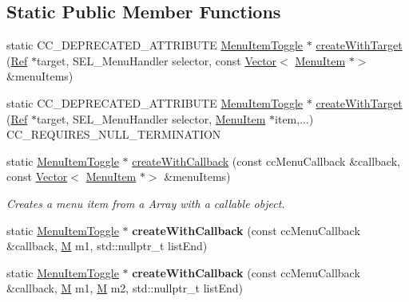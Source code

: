 \subsection*{Static Public Member Functions}
\begin{DoxyCompactItemize}
\item 
static C\+C\+\_\+\+D\+E\+P\+R\+E\+C\+A\+T\+E\+D\+\_\+\+A\+T\+T\+R\+I\+B\+U\+TE \hyperlink{classMenuItemToggle}{Menu\+Item\+Toggle} $\ast$ \hyperlink{classMenuItemToggle_adb831c11bcd0f689b97d307b3430040d}{create\+With\+Target} (\hyperlink{classRef}{Ref} $\ast$target, S\+E\+L\+\_\+\+Menu\+Handler selector, const \hyperlink{classVector}{Vector}$<$ \hyperlink{classMenuItem}{Menu\+Item} $\ast$$>$ \&menu\+Items)
\item 
static C\+C\+\_\+\+D\+E\+P\+R\+E\+C\+A\+T\+E\+D\+\_\+\+A\+T\+T\+R\+I\+B\+U\+TE \hyperlink{classMenuItemToggle}{Menu\+Item\+Toggle} $\ast$ \hyperlink{classMenuItemToggle_ad82bf7c116dd2f72741bf97ed7b2cb16}{create\+With\+Target} (\hyperlink{classRef}{Ref} $\ast$target, S\+E\+L\+\_\+\+Menu\+Handler selector, \hyperlink{classMenuItem}{Menu\+Item} $\ast$item,...) C\+C\+\_\+\+R\+E\+Q\+U\+I\+R\+E\+S\+\_\+\+N\+U\+L\+L\+\_\+\+T\+E\+R\+M\+I\+N\+A\+T\+I\+ON
\item 
\mbox{\label{classMenuItemToggle_af1a5874efac942870f741645310a8b80}} 
static \hyperlink{classMenuItemToggle}{Menu\+Item\+Toggle} $\ast$ \hyperlink{classMenuItemToggle_af1a5874efac942870f741645310a8b80}{create\+With\+Callback} (const cc\+Menu\+Callback \&callback, const \hyperlink{classVector}{Vector}$<$ \hyperlink{classMenuItem}{Menu\+Item} $\ast$$>$ \&menu\+Items)
\begin{DoxyCompactList}\small\item\em Creates a menu item from a Array with a callable object. \end{DoxyCompactList}\item 
\mbox{\label{classMenuItemToggle_a3985f6173d4705b53b7e25a028309008}} 
static \hyperlink{classMenuItemToggle}{Menu\+Item\+Toggle} $\ast$ {\bfseries create\+With\+Callback} (const cc\+Menu\+Callback \&callback, \hyperlink{classMenuItemToggle_a4f44d80e256ed59e1994b4a04f009903}{M} m1, std\+::nullptr\+\_\+t list\+End)
\item 
\mbox{\label{classMenuItemToggle_adf09da6ceee836391facf064fff9c13b}} 
static \hyperlink{classMenuItemToggle}{Menu\+Item\+Toggle} $\ast$ {\bfseries create\+With\+Callback} (const cc\+Menu\+Callback \&callback, \hyperlink{classMenuItemToggle_a4f44d80e256ed59e1994b4a04f009903}{M} m1, \hyperlink{classMenuItemToggle_a4f44d80e256ed59e1994b4a04f009903}{M} m2, std\+::nullptr\+\_\+t list\+End)

\end{DoxyCompactItemize}
